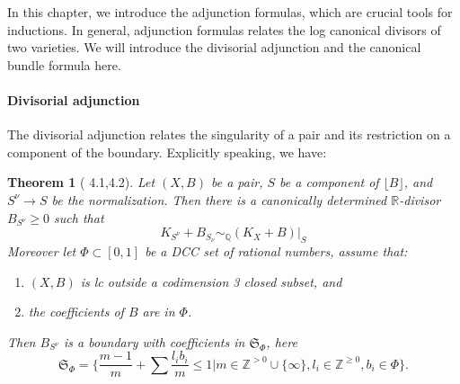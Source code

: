 \documentclass[letterpaper,reqno,12pt]{amsart}
\newcommand{\tbf}{\textbf}
\numberwithin{equation}{section}
\theoremstyle{plain}
\newtheorem{theorem}{Theorem}[section]
\begin{document}
In this chapter, we introduce the adjunction formulas, which are crucial tools for inductions. In general, adjunction formulas relates the log canonical divisors of two varieties. We will introduce the divisorial adjunction and the canonical bundle formula here.

\paragraph{\tbf{Divisorial adjunction}}
The divisorial adjunction relates the singularity of a pair and its restriction on a component of the boundary. Explicitly speaking, we have:
\begin{theorem}[\cite{birkar2014existenceflipsminimalmodels} 4.1,4.2]\label{divadj}
    Let $(X,B)$ be a pair, $S$ be a component of $\lfloor B\rfloor$, and $S^\nu\to S$ be the normalization. Then there is a canonically determined $\mathbb R$-divisor $B_{S^\nu} \geq 0$ such that
\[K_{S^\nu} + B_{S_\nu} \sim_{\mathbb Q} (K_X + B)|_S\]
Moreover let $\Phi\subset [0, 1]$ be a DCC set of rational numbers, assume that:
\begin{enumerate}
    \item $(X,B)$ is lc outside a codimension 3 closed subset, and
    \item the coefficients of $B$ are in $\Phi$.
\end{enumerate}
Then $B_{S^\nu}$ is a boundary with coefficients in $\mathfrak S_\Phi$, here
\[\mathfrak S_\Phi=\{\frac{m-1}{m}+\sum\frac{l_ib_i}{m}\leq 1|m\in\mathbb Z^{>0}\cup\{\infty\},l_i\in\mathbb Z^{\geq 0},b_i\in\Phi\}.\]

\end{theorem}
\end{document}
